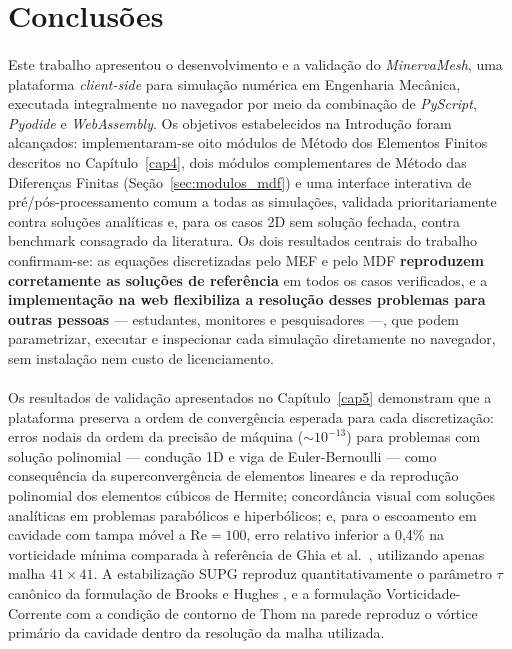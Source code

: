 \section{Conclusões}
\label{sec:conclusao}

\paragraph{}Este trabalho apresentou o desenvolvimento e a validação do \textit{MinervaMesh}, uma plataforma \textit{client-side} para simulação numérica em Engenharia Mecânica, executada integralmente no navegador por meio da combinação de \textit{PyScript}, \textit{Pyodide} e \textit{WebAssembly}. Os objetivos estabelecidos na Introdução foram alcançados: implementaram-se oito módulos de Método dos Elementos Finitos descritos no Capítulo~\ref{cap4}, dois módulos complementares de Método das Diferenças Finitas (Seção~\ref{sec:modulos_mdf}) e uma interface interativa de pré/pós-processamento comum a todas as simulações, validada prioritariamente contra soluções analíticas e, para os casos 2D sem solução fechada, contra benchmark consagrado da literatura. Os dois resultados centrais do trabalho confirmam-se: as equações discretizadas pelo MEF e pelo MDF \textbf{reproduzem corretamente as soluções de referência} em todos os casos verificados, e a \textbf{implementação na web flexibiliza a resolução desses problemas para outras pessoas} --- estudantes, monitores e pesquisadores ---, que podem parametrizar, executar e inspecionar cada simulação diretamente no navegador, sem instalação nem custo de licenciamento.

\paragraph{}Os resultados de validação apresentados no Capítulo~\ref{cap5} demonstram que a plataforma preserva a ordem de convergência esperada para cada discretização: erros nodais da ordem da precisão de máquina ($\sim 10^{-13}$) para problemas com solução polinomial --- condução 1D e viga de Euler-Bernoulli --- como consequência da superconvergência de elementos lineares e da reprodução polinomial dos elementos cúbicos de Hermite; concordância visual com soluções analíticas em problemas parabólicos e hiperbólicos; e, para o escoamento em cavidade com tampa móvel a $\text{Re}=100$, erro relativo inferior a 0,4\% na vorticidade mínima comparada à referência de Ghia et al.\ \cite{Ghia1982}, utilizando apenas malha $41 \times 41$. A estabilização SUPG reproduz quantitativamente o parâmetro $\tau$ canônico da formulação de Brooks e Hughes \cite{Brooks1982}, e a formulação Vorticidade-Corrente com a condição de contorno de Thom \cite{Thom1933} na parede reproduz o vórtice primário da cavidade dentro da resolução da malha utilizada.

